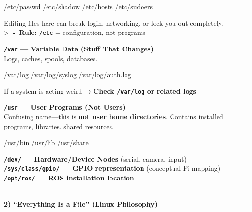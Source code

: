 \documentclass[
  english,
  paper=a4,
  oneside  ,captions=tableheading
]{scrartcl}
\newenvironment{Shaded}{}{}
\newcommand{\ExtensionTok}[1]{#1}
\begin{document}
\begin{Shaded}
\begin{Highlighting}[]
\ExtensionTok{/etc/passwd}
\ExtensionTok{/etc/shadow}
\ExtensionTok{/etc/hosts}
\ExtensionTok{/etc/sudoers}
\end{Highlighting}
\end{Shaded}

\faExclamationCircle Editing files here can break login, networking, or
lock you out completely.\\
\textgreater{} • \textbf{Rule:} \texttt{/etc} = configuration, not
programs

\textbf{\texttt{/var} --- Variable Data (Stuff That Changes)}\\
Logs, caches, spools, databases.

\begin{Shaded}
\begin{Highlighting}[]
\ExtensionTok{/var/log}
\ExtensionTok{/var/log/syslog}
\ExtensionTok{/var/log/auth.log}
\end{Highlighting}
\end{Shaded}

If a system is acting weird → \textbf{Check \texttt{/var/log} or related
logs}

\textbf{\texttt{/usr} --- User Programs (Not Users)}\\
Confusing name---this is \textbf{not user home directories}. Contains
installed programs, libraries, shared resources.

\begin{Shaded}
\begin{Highlighting}[]
\ExtensionTok{/usr/bin}
\ExtensionTok{/usr/lib}
\ExtensionTok{/usr/share}
\end{Highlighting}
\end{Shaded}

\textbf{\texttt{/dev/} --- Hardware/Device Nodes} (serial, camera,
input)\\
\textbf{\texttt{/sys/class/gpio/} --- GPIO representation} (conceptual
Pi mapping)\\
\textbf{\texttt{/opt/ros/} --- ROS installation location}

\begin{center}\rule{0.5\linewidth}{0.5pt}\end{center}

\paragraph{2) ``Everything Is a File'' (Linux
Philosophy)}\label{everything-is-a-file-linux-philosophy}
\end{document}
